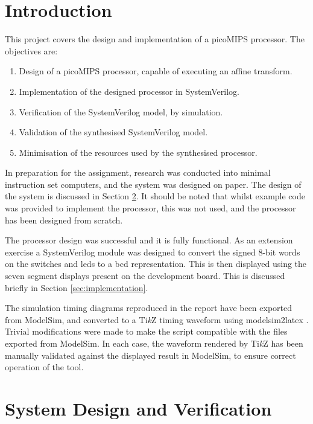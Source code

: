 \section{Introduction} \label{sec:intro}

This project covers the design and implementation of a picoMIPS processor. The objectives are:
\begin{enumerate}
	\item Design of a picoMIPS processor, capable of executing an affine transform. \label{obj:design}
	\item Implementation of the designed processor in SystemVerilog. \label{obj:imp}
	\item Verification of the SystemVerilog model, by simulation. \label{obj:verif}
	\item Validation of the synthesised SystemVerilog model. \label{obj:valid}
	\item Minimisation of the resources used by the synthesised processor. \label{obj:minimal}
\end{enumerate}

In preparation for the assignment, research was conducted into minimal instruction set computers, and the system was designed on paper. The design of the system is discussed in Section \ref{sec:design-verif}. It should be noted that whilst example code was provided to implement the processor, this was not used, and the processor has been designed from scratch.

The processor design was successful and it is fully functional. As an extension exercise a SystemVerilog module was designed to convert the signed 8-bit words on the switches and \glspl{led} to a \gls{bcd} representation. This is then displayed using the seven segment displays present on the development board. This is discussed briefly in Section \ref{sec:implementation}.

The simulation timing diagrams reproduced in the report have been exported from ModelSim, and converted to a Ti\textit{k}Z timing waveform using modelsim2latex \cite{show2016}. Trivial modifications were made to make the script compatible with the files exported from ModelSim. In each case, the waveform rendered by Ti\textit{k}Z has been manually validated against the displayed result in ModelSim, to ensure correct operation of the tool.

\section{System Design and Verification} \label{sec:design-verif}

